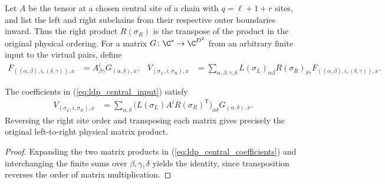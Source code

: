 \begin{definition}
    \label{def:ldp_central_input}
    \leanok
    Let $A$ be the tensor at a chosen central site of a chain with $q=\ell+1+r$
    sites, and list the left and right subchains from their respective
    outer boundaries inward. Thus the right product $R(\sigma_R)$ is the
    transpose of the product in the original physical ordering. For a
    matrix $G\colon\C^s\to\C^{D^2}$ from an arbitrary finite input to the virtual pairs, define
    \begin{align}
        F_{((\alpha,\beta),i,(\delta,\gamma)),x}
         & =A^i_{\beta\gamma}G_{(\alpha,\delta),x},
         & V_{(\sigma_L,i,\sigma_R),x}
         & =\sum_{\alpha,\beta,\gamma,\delta}
        L(\sigma_L)_{\alpha\beta}R(\sigma_R)_{\delta\gamma}
        F_{((\alpha,\beta),i,(\delta,\gamma)),x}.
        \label{eq:ldp_central_input}
    \end{align}
\end{definition}

\begin{lemma}
    \label{thm:ldp_central_coefficients}
    \leanok
    The coefficients in (\ref{eq:ldp_central_input}) satisfy
    \begin{align}
        V_{(\sigma_L,i,\sigma_R),x}
         & =\sum_{\alpha,\delta}
        \bigl(L(\sigma_L)A^iR(\sigma_R)^{\mathsf T}\bigr)_{\alpha\delta}
        G_{(\alpha,\delta),x}.
        \label{eq:ldp_central_coefficients}
    \end{align}
    Reversing the right site order and transposing each matrix gives
    precisely the original left-to-right physical matrix product.
\end{lemma}
\begin{proof}
    \leanok
    Expanding the two matrix products in (\ref{eq:ldp_central_coefficients})
    and interchanging the finite sums over $\beta,\gamma,\delta$ yields the
    identity, since transposition reverses the order of matrix multiplication.
\end{proof}

